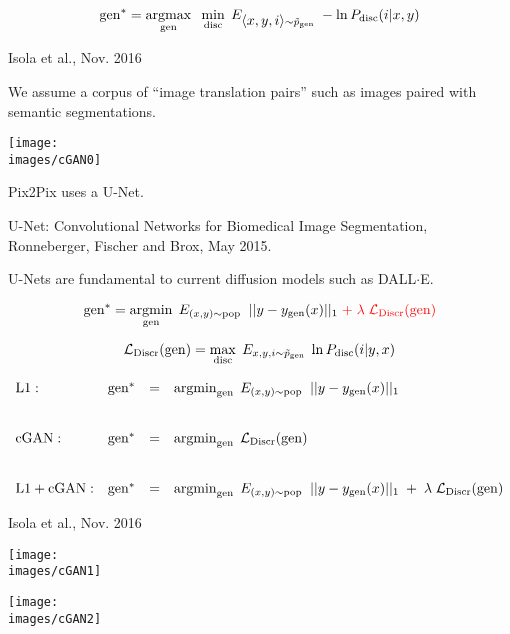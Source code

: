 {{\color{red} $$\mathrm{gen}^* = \operatorname*{argmax}_{\mathrm{gen}}\;\;\min_{\mathrm{disc}}\;E_{{\mbox{$\langle x,y,i\rangle$}} \sim \tilde{p}_{\mathrm{gen}}}\;-\ln P_{\mathrm{disc}}(i|x,y)$$}

{Isola et al., Nov. 2016}

We assume a corpus of ``image translation pairs'' such as images paired with semantic segmentations.

\centerline{\texttt{[image: \\images/cGAN0]}}


Pix2Pix uses a U-Net.

\vfill
U-Net: Convolutional Networks for Biomedical Image Segmentation, Ronneberger, Fischer and Brox, May 2015.

\vfill
U-Nets are fundamental to current diffusion models such as DALL$\cdot$E.


$$\mathrm{gen}^* = \operatorname*{argmin}_{\mathrm{gen}}\;E_{(x,y) \sim \mathrm{pop}}\;\; ||y- y_{\mathrm{gen}}(x)||_1\; {\color{red} + \; \lambda\; {\cal L}_{\mathrm{Discr}}(\mathrm{gen})}$$

\vfill
$${\cal L}_\mathrm{Discr}(\mathrm{gen}) = \max_{\mathrm{disc}} \;E_{x,y,i \sim \tilde{p}_{\mathrm{gen}}}\; \ln P_{\mathrm{disc}}(i|y,x)$$


{\huge
$$\begin{array}{lrcl}
\mathrm{L1:} & \mathrm{gen}^* & = & \operatorname*{argmin}_{\mathrm{gen}}\;E_{(x,y) \sim \mathrm{pop}}\;\; ||y - y_{\mathrm{gen}}(x)||_1 \\
\\
\\
\mathrm{cGAN:} & \mathrm{gen}^* & = & \operatorname*{argmin}_{\mathrm{gen}}\;{\cal L}_{\mathrm{Discr}}(\mathrm{gen}) \\
\\
\\
\mathrm{L1 + cGAN:} & \mathrm{gen}^* & = & \operatorname*{argmin}_{\mathrm{gen}}\;E_{(x,y) \sim \mathrm{pop}}\;\; ||y - y_{\mathrm{gen}}(x)||_1\; +\; \lambda\; {\cal L}_\mathrm{Discr}(\mathrm{gen})
\end{array}$$
}


{Isola et al., Nov. 2016}

\centerline{\texttt{[image: \\images/cGAN1]}}


\centerline{\texttt{[image: \\images/cGAN2]}}


}
